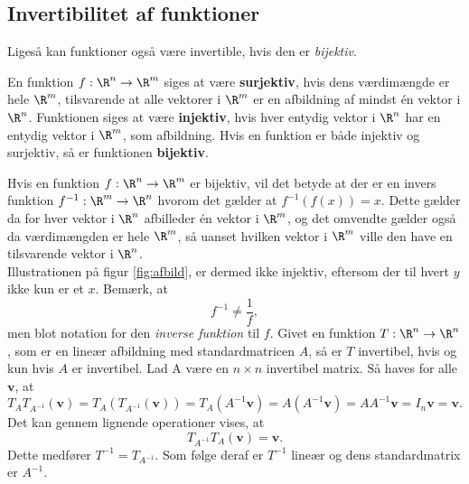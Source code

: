 %
%
\subsection{Invertibilitet af funktioner}
%
% 
Ligeså kan funktioner også være invertible, hvis den er \textit{bijektiv}.
%
\begin{defn}{}{}
En funktion $f:\R^n \rightarrow \R^m$ siges at være \textbf{surjektiv}, hvis dens værdimængde er hele $\R^m$, tilsvarende at alle vektorer i $\R^m$ er en afbildning af mindst én vektor i $\R^n$.
Funktionen siges at være \textbf{injektiv}, hvis hver entydig vektor i $\R^n$ har en entydig vektor i $\R^m$, som afbildning.
Hvis en funktion er både injektiv og surjektiv, så er funktionen \textbf{bijektiv}.
\end{defn}
\noindent
%
Hvis en funktion $f:\R^n \rightarrow \R^m$ er bijektiv, vil det betyde at der er en invers funktion $f^{-1}:\R^m \rightarrow \R^n$ hvorom det gælder at $f^{-1}(f(x))=x$. Dette gælder da for hver vektor i $\R^n$ afbilleder én vektor i $\R^m$, og det omvendte gælder også da værdimængden er hele $\R^m$, så uanset hvilken vektor i $\R^m$ ville den have en tilsvarende vektor i $\R^n$.\\
Illustrationen på figur \ref{fig:afbild}, er dermed ikke injektiv, eftersom der til hvert $y$ ikke kun er et $x$. 
%
%
Bemærk, at
$$f^{-1} \neq \frac{1}{f},$$
men blot notation for den \textit{inverse funktion} til $f$.
Givet en funktion $T:\R^n \rightarrow \R^n$, som er en lineær afbildning med standardmatricen $A$, så er $T$ invertibel, hvis og kun hvis $A$ er invertibel. 
Lad A være en $n \times n$ invertibel matrix. 
Så haves for alle $\textbf{v}$, at
$$T_AT_{A^{-1}}(\textbf{v})=T_A(T_{A^{-1}}(\textbf{v}))=T_A(A^{-1}\textbf{v})=A(A^{-1}\textbf{v})=AA^{-1}\textbf{v}=I_n\textbf{v}=\textbf{v}.$$
Det kan gennem lignende operationer vises, at
$$T_{A^{-1}}T_A(\textbf{v})=\textbf{v}.$$
%
Dette medfører $T^{-1}=T_{A^{-1}}$. 
Som følge deraf er $T^{-1}$ lineær og dens standardmatrix er $A^{-1}$.
\\
%
